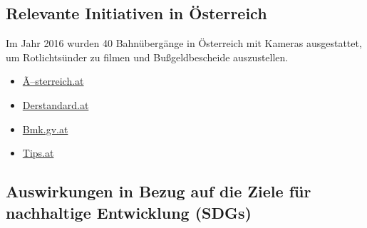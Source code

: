 \documentclass[
]{book}
\providecommand{\tightlist}{%
  \setlength{\itemsep}{0pt}\setlength{\parskip}{0pt}}
\begin{document}
\hypertarget{relevante-initiativen-in-uxf6sterreich-2}{%
\subsection*{Relevante Initiativen in Österreich}\label{relevante-initiativen-in-uxf6sterreich-2}}

Im Jahr 2016 wurden 40 Bahnübergänge in Österreich mit Kameras ausgestattet, um Rotlichtsünder zu filmen und Bußgeldbescheide auszustellen.

\begin{itemize}
\tightlist
\item
  \href{https://www.Ã¶sterreich.at/chronik/oebb-ueberwachen-bahnuebergaenge-mit-kameras/251039735}{Ã--sterreich.at}
\item
  \href{https://www.derstandard.at/story/2000038658674/im-vorjahr-124-unfaelle-bei-eisenbahnkreuzungen-mit-21-toten}{Derstandard.at}
\item
  \href{https://www.bmk.gv.at/themen/verkehr/eisenbahn/sicherheit/bahnuebergaenge/sicherhandeln.html}{Bmk.gv.at}
\item
  \href{https://www.tips.at/nachrichten/urfahr-umgebung/land-leute/519686-neuer-bahnschranken-fuer-mehr-sicherheit}{Tips.at}
\end{itemize}

\hypertarget{auswirkungen-in-bezug-auf-die-ziele-fuxfcr-nachhaltige-entwicklung-sdgs-2}{%
\subsection*{Auswirkungen in Bezug auf die Ziele für nachhaltige Entwicklung (SDGs)}\label{auswirkungen-in-bezug-auf-die-ziele-fuxfcr-nachhaltige-entwicklung-sdgs-2}}
\end{document}
